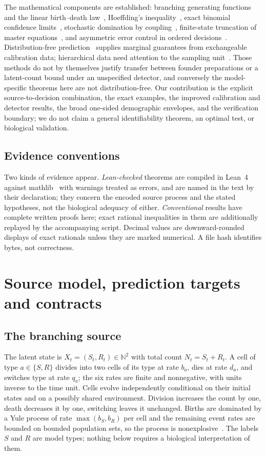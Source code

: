 \documentclass[11pt,a4paper]{article}
\theoremstyle{plain}
\theoremstyle{definition}
\theoremstyle{remark}
\newcommand{\N}{\mathbb N}
\begin{document}
The mathematical components are established: branching generating functions and the linear birth--death law~\citep{yule1925,kendall1948,harris1963,athreyaney1972,kimmelaxelrod2015}, Hoeffding's inequality~\citep{hoeffding1963}, exact binomial confidence limits~\citep{clopper1934}, stochastic domination by coupling~\citep{lindvall1992}, finite-state truncation of master equations~\citep{munsky2006}, and asymmetric error control in ordered decisions~\citep{lehmannromano2005}. Distribution-free prediction~\citep{vovk2005,angelopoulos2023} supplies marginal guarantees from exchangeable calibration data; hierarchical data need attention to the sampling unit~\citep{lee2023}. Those methods do not by themselves justify transfer between founder preparations or a latent-count bound under an unspecified detector, and conversely the model-specific theorems here are not distribution-free. Our contribution is the explicit source-to-decision combination, the exact examples, the improved calibration and detector results, the broad one-sided demographic envelopes, and the verification boundary; we do not claim a general identifiability theorem, an optimal test, or biological validation.

\subsection{Evidence conventions}
Two kinds of evidence appear. \emph{Lean-checked} theorems are compiled in Lean~4~\citep{demoura2021} against mathlib~\citep{mathlib2020} with warnings treated as errors, and are named in the text by their declaration; they concern the encoded source process and the stated hypotheses, not the biological adequacy of either. \emph{Conventional} results have complete written proofs here; exact rational inequalities in them are additionally replayed by the accompanying script. Decimal values are downward-rounded displays of exact rationals unless they are marked numerical. A file hash identifies bytes, not correctness.

\section{Source model, prediction targets and contracts}\label{sec:model}

\subsection{The branching source}
The latent state is $X_t=(S_t,R_t)\in\N^2$ with total count $N_t=S_t+R_t$. A cell of type $a\in\{S,R\}$ divides into two cells of its type at rate $b_a$, dies at rate $d_a$, and switches type at rate $q_a$; the six rates are finite and nonnegative, with units inverse to the time unit. Cells evolve independently conditional on their initial states and on a possibly shared environment. Division increases the count by one, death decreases it by one, switching leaves it unchanged. Births are dominated by a Yule process of rate $\max(b_S,b_R)$ per cell and the remaining event rates are bounded on bounded population sets, so the process is nonexplosive~\citep{norris1997}. The labels $S$ and $R$ are model types; nothing below requires a biological interpretation of them.
\end{document}
